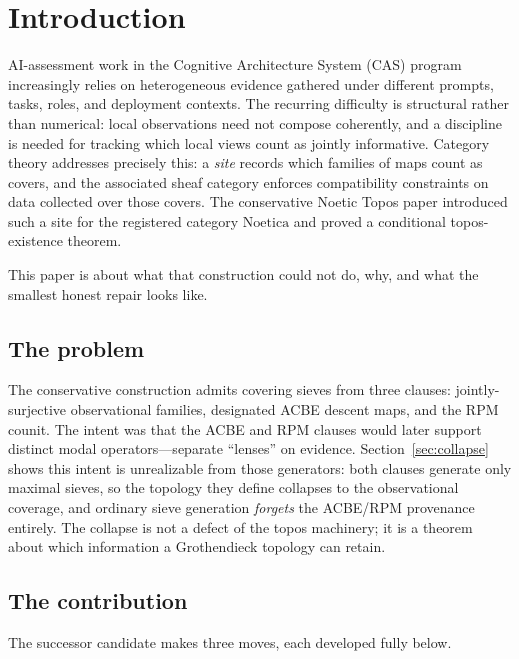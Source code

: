 \documentclass[11pt]{amsart}
\theoremstyle{definition}
\theoremstyle{remark}
\newcommand{\Noe}{\mathrm{Noetica}}
\begin{document}
\section{Introduction}

AI-assessment work in the Cognitive Architecture System (CAS) program increasingly relies on heterogeneous evidence gathered under different prompts, tasks, roles, and deployment contexts. The recurring difficulty is structural rather than numerical: local observations need not compose coherently, and a discipline is needed for tracking which local views count as jointly informative. Category theory addresses precisely this: a \emph{site} records which families of maps count as covers, and the associated sheaf category enforces compatibility constraints on data collected over those covers. The conservative Noetic Topos paper introduced such a site for the registered category $\Noe$ and proved a conditional topos-existence theorem.

This paper is about what that construction could not do, why, and what the smallest honest repair looks like.

\subsection{The problem}
The conservative construction admits covering sieves from three clauses: jointly-surjective observational families, designated ACBE descent maps, and the RPM counit. The intent was that the ACBE and RPM clauses would later support distinct modal operators---separate ``lenses'' on evidence. Section~\ref{sec:collapse} shows this intent is unrealizable from those generators: both clauses generate only maximal sieves, so the topology they define collapses to the observational coverage, and ordinary sieve generation \emph{forgets} the ACBE/RPM provenance entirely. The collapse is not a defect of the topos machinery; it is a theorem about which information a Grothendieck topology can retain.

\subsection{The contribution}
The successor candidate makes three moves, each developed fully below.
\end{document}
